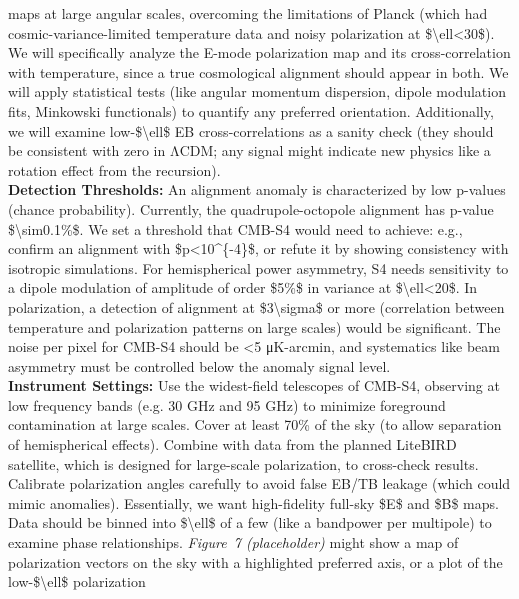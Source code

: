\documentclass[]{article}
\begin{document}
\begin{enumerate}
  maps at large angular scales, overcoming the limitations of Planck
  (which had cosmic-variance-limited temperature data and noisy
  polarization at \$\textbackslash{}ell\textless{}30\$)​. We will
  specifically analyze the E-mode polarization map and its
  cross-correlation with temperature, since a true cosmological
  alignment should appear in both​. We will apply statistical tests
  (like angular momentum dispersion, dipole modulation fits, Minkowski
  functionals) to quantify any preferred orientation. Additionally, we
  will examine low-\$\textbackslash{}ell\$ EB cross-correlations as a
  sanity check (they should be consistent with zero in ΛCDM; any signal
  might indicate new physics like a rotation effect from the
  recursion).\\
  \textbf{Detection Thresholds:} An alignment anomaly is characterized
  by low p-values (chance probability). Currently, the
  quadrupole-octopole alignment has p-value
  \$\textbackslash{}sim0.1\%\$​. We set a threshold that CMB-S4 would
  need to achieve: e.g., confirm an alignment with
  \$p\textless{}10\^{}\{-4\}\$, or refute it by showing consistency with
  isotropic simulations. For hemispherical power asymmetry, S4 needs
  sensitivity to a dipole modulation of amplitude of order \$5\%\$ in
  variance at \$\textbackslash{}ell\textless{}20\$. In polarization, a
  detection of alignment at \$3\textbackslash{}sigma\$ or more
  (correlation between temperature and polarization patterns on large
  scales) would be significant. The noise per pixel for CMB-S4 should be
  \textless{}5 μK-arcmin, and systematics like beam asymmetry must be
  controlled below the anomaly signal level.\\
  \textbf{Instrument Settings:} Use the widest-field telescopes of
  CMB-S4, observing at low frequency bands (e.g. 30 GHz and 95 GHz) to
  minimize foreground contamination at large scales. Cover at least 70\%
  of the sky (to allow separation of hemispherical effects). Combine
  with data from the planned LiteBIRD satellite, which is designed for
  large-scale polarization, to cross-check results​. Calibrate
  polarization angles carefully to avoid false EB/TB leakage (which
  could mimic anomalies). Essentially, we want high-fidelity full-sky
  \$E\$ and \$B\$ maps. Data should be binned into
  \$\textbackslash{}ell\$ of a few (like a bandpower per multipole) to
  examine phase relationships. \emph{Figure~7 (placeholder)} might show
  a map of polarization vectors on the sky with a highlighted preferred
  axis, or a plot of the low-\$\textbackslash{}ell\$ polarization

\end{enumerate}
\end{document}
